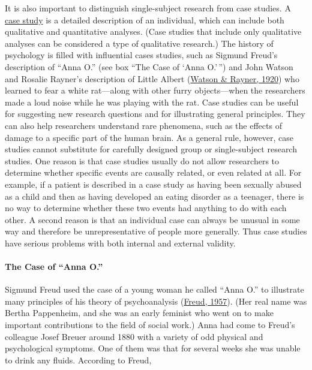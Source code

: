 \documentclass[
]{krantz}
\begin{document}
It is also important to distinguish single-subject research from case studies. A \protect\hyperlink{case-study}{case study} is a detailed description of an individual, which can include both qualitative and quantitative analyses. (Case studies that include only qualitative analyses can be considered a type of qualitative research.) The history of psychology is filled with influential cases studies, such as Sigmund Freud's description of ``Anna O.'' (see box ``The Case of `Anna O.'\,'') and John Watson and Rosalie Rayner's description of Little Albert (\protect\hyperlink{ref-watson1920conditioned}{Watson \& Rayner, 1920}) who learned to fear a white rat---along with other furry objects---when the researchers made a loud noise while he was playing with the rat. Case studies can be useful for suggesting new research questions and for illustrating general principles. They can also help researchers understand rare phenomena, such as the effects of damage to a specific part of the human brain. As a general rule, however, case studies cannot substitute for carefully designed group or single-subject research studies. One reason is that case studies usually do not allow researchers to determine whether specific events are causally related, or even related at all. For example, if a patient is described in a case study as having been sexually abused as a child and then as having developed an eating disorder as a teenager, there is no way to determine whether these two events had anything to do with each other. A second reason is that an individual case can always be unusual in some way and therefore be unrepresentative of people more generally. Thus case studies have serious problems with both internal and external validity.

\hypertarget{the-case-of-anna-o.}{%
\paragraph*{The Case of ``Anna O.''}\label{the-case-of-anna-o.}}

Sigmund Freud used the case of a young woman he called ``Anna O.'' to illustrate many principles of his theory of psychoanalysis (\protect\hyperlink{ref-freud1957five}{Freud, 1957}). (Her real name was Bertha Pappenheim, and she was an early feminist who went on to make important contributions to the field of social work.) Anna had come to Freud's colleague Josef Breuer around 1880 with a variety of odd physical and psychological symptoms. One of them was that for several weeks she was unable to drink any fluids. According to Freud,
\end{document}

